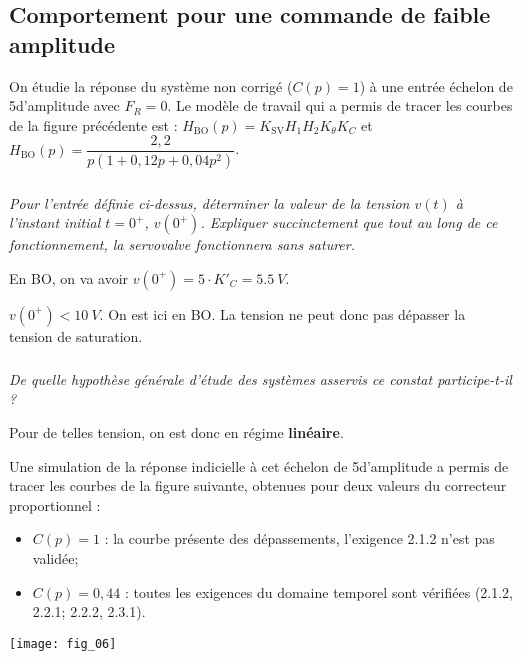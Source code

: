 \begin{multicols}{2}
\begin{corrige}
\end{corrige}
\else
\fi

\subsection*{Comportement pour une commande de faible amplitude}
\ifprof
\else
On étudie la réponse du système non corrigé ($C(p) = 1$) à une entrée échelon de 5\degres\;d’amplitude avec $F_R = 0$.
Le modèle de travail qui a permis de tracer les courbes de la figure précédente est :
$H_{\text{BO}}(p)=K_{\text{SV}} H_1 H_2 K_{\theta} K_C$ et $H_{\text{BO}}(p)=\dfrac{2,2}{p\left(1+0,12p + 0,04 p ^2  \right)}$.
\fi

\subparagraph{}\textit{Pour l’entrée définie ci-dessus, déterminer la valeur de la tension $v(t)$ à l’instant initial $t=0^{+}$, $v(0^{+})$. Expliquer succinctement que tout au long de ce fonctionnement, la servovalve fonctionnera sans saturer.}
\ifprof
\begin{corrige} En BO, on va avoir $v(0^{+})=5\cdot K'_C =\SI{5,5}{V}$. 

$v(0^{+})<\SI{10}{V}$. On est ici en BO. La tension ne peut donc pas dépasser la tension de saturation. 
\end{corrige}
\else
\fi





\subparagraph{}\textit{De quelle hypothèse générale d’étude des systèmes asservis ce constat participe-t-il ?}
\ifprof
\begin{corrige}
Pour de telles tension, on est donc en régime \textbf{linéaire}.
\end{corrige}
\else
\fi

\ifprof
\else
Une simulation de la réponse indicielle à cet échelon de 5\degres d’amplitude a permis de tracer les courbes de la
figure suivante, obtenues pour deux valeurs du correcteur proportionnel :
\begin{itemize}
\item $C(p) = 1$ : la courbe présente des dépassements, l'exigence 2.1.2 n'est pas validée;%
\item $C(p) = 0,44$ : toutes les exigences du domaine temporel sont vérifiées (2.1.2, 2.2.1; 2.2.2, 2.3.1).%
\end{itemize}

\begin{center}
\texttt{[image: fig\_06]}
\end{center}


\end{multicols}
